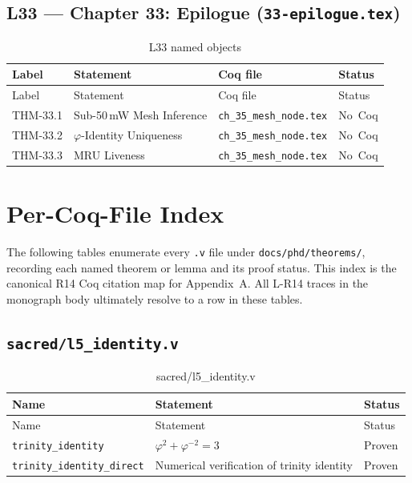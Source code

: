 \subsection{L33 — Chapter 33: Epilogue (\texttt{33-epilogue.tex})}
\label{sec:A-L33}

\begin{longtable}{lp{6cm}ll}
\toprule
Label & Statement & Coq file & Status \\
\midrule
\endfirsthead
\toprule
Label & Statement & Coq file & Status \\
\midrule
\endhead
\bottomrule
\endfoot
\bottomrule
\caption{L33 named objects}
\endlastfoot
THM-33.1 & Sub-50\,mW Mesh Inference &
  \texttt{ch\_35\_mesh\_node.tex} & No~Coq \\
THM-33.2 & $\varphi$-Identity Uniqueness &
  \texttt{ch\_35\_mesh\_node.tex} & No~Coq \\
THM-33.3 & MRU Liveness &
  \texttt{ch\_35\_mesh\_node.tex} & No~Coq \\
\end{longtable}

\section{Per-Coq-File Index}
\label{sec:A-coq-index}

The following tables enumerate every \texttt{.v} file under
\texttt{docs/phd/theorems/}, recording each named theorem or lemma and
its proof status.  This index is the canonical R14 Coq citation map for
Appendix~A.  All L-R14 traces in the monograph body ultimately resolve
to a row in these tables.

\subsection{\texttt{sacred/l5\_identity.v}}
\label{sec:A-coq-l5}

\begin{longtable}{lll}
\toprule
Name & Statement & Status \\
\midrule
\endfirsthead
\toprule
Name & Statement & Status \\
\midrule
\endhead
\bottomrule
\endfoot
\bottomrule
\caption{sacred/l5\_identity.v}
\endlastfoot
\texttt{trinity\_identity} & $\varphi^{2}+\varphi^{-2}=3$ & Proven \\
\texttt{trinity\_identity\_direct} &
  Numerical verification of trinity identity & Proven \\
\end{longtable}

